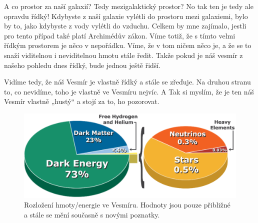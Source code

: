 \documentclass[10pt,a5paper,twoside]{book}
\begin{document}
\par
A co prostor za naší galaxií? Tedy mezigalaktický prostor? No tak ten je tedy ale opravdu řídký! Kdybyste z naší galaxie vylétli do prostoru mezi galaxiemi, bylo by to, jako kdybyste z vody vylétli do vzduchu. Celkem by mne zajímalo, jestli pro tento případ také platí Archimédův zákon. Víme totiž, že s tímto velmi řídkým prostorem je něco v nepořádku. Víme, že v tom ničem něco je, a že se to snaží viditelnou i neviditelnou hmotu stále ředit. Takže pokud je náš vesmír z našeho pohledu dnes řídký, bude jednou ještě řidší.
\par
Vidíme tedy, že náš Vesmír je vlastně řídký a stále se zřeďuje. Na druhou stranu to, co nevidíme, toho je vlastně ve Vesmíru nejvíc. A Tak si myslím, že je ten náš Vesmír vlastně „hustý“ a stojí za to, ho pozorovat.
\begin{figure}[htbp]
	\begin{center}
		\includegraphics[width=12cm]{husty.eps}
	  	\caption{Rozložení hmoty/energie ve Vesmíru. Hodnoty jsou pouze přibližné a stále se mění současně s novými poznatky.}
	  	\label{fig:}
	\end{center}
\end{figure}
\end{document}
